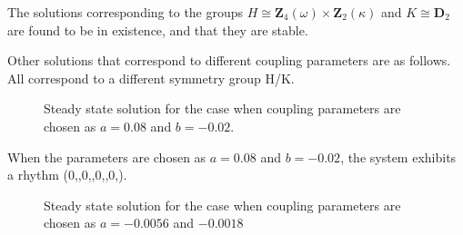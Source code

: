 
The solutions corresponding to the groups $H \cong \mathbf{Z}_4(\omega) \times \mathbf{Z}_2(\kappa)$ and $K \cong \mathbf{D}_2$ are found to be in existence, and that they are stable.

Other solutions that correspond to different coupling parameters are as follows. All correspond to a different symmetry group H/K.

\begin{figure}[h]
\centering

 




\label{fig:gait2}
\caption{Steady state solution for the case when coupling parameters are chosen as $a = 0.08$ and $b = -0.02$.}
\end{figure}

When the parameters are chosen as $a = 0.08$ and $b = -0.02$, the system exhibits a rhythm (0,,0,,0,,0,). 

\begin{figure}[h]
\centering

 




\label{fig:gait3}
\caption{Steady state solution for the case when coupling parameters are chosen as $a = -0.0056$ and $-0.0018$}
\end{figure}

